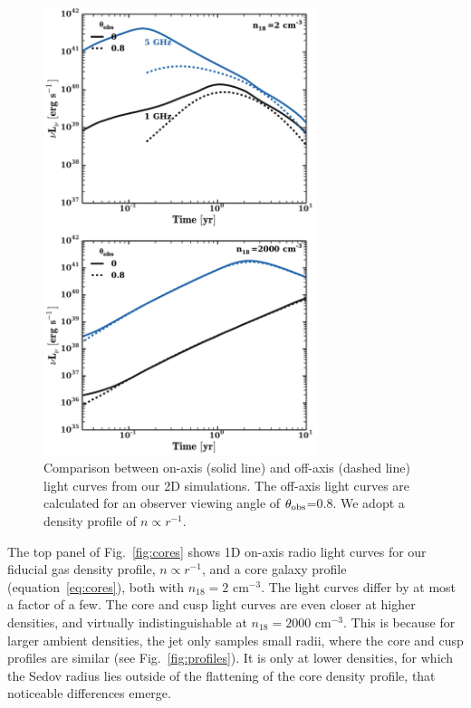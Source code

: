\documentclass[usenatbib,fleqn]{mnras}
\begin{document}
\begin{figure}
\includegraphics[width=8cm]{on_off.pdf}
\caption{\label{fig:onOff} Comparison between on-axis (solid line) and
  off-axis (dashed line) light curves from our 2D simulations.  The
  off-axis light curves are calculated for an observer viewing angle
  of $\theta_{\rm obs}$=0.8.  We adopt a density profile of $n\propto
  r^{-1}$.}
\end{figure}

\label{sec:profileComp}
The top panel of Fig.~\ref{fig:cores} shows 1D on-axis radio light
curves for our fiducial gas density profile, $n\propto r^{-1}$, and a
core galaxy profile (equation~\ref{eq:cores}), both with $n_{18}=2$
cm$^{-3}$.  The light curves differ by at most a factor of a few. The
core and cusp light curves are even closer at higher densities, and
virtually indistinguishable at $n_{18}=2000$ cm$^{-3}$. This is
because for larger ambient densities, the jet only samples small
radii, where the core and cusp profiles are similar (see
Fig.~\ref{fig:profiles}). It is only at lower densities, for which the
Sedov radius lies outside of the flattening of the core density
profile, that noticeable differences emerge.
\end{document}
